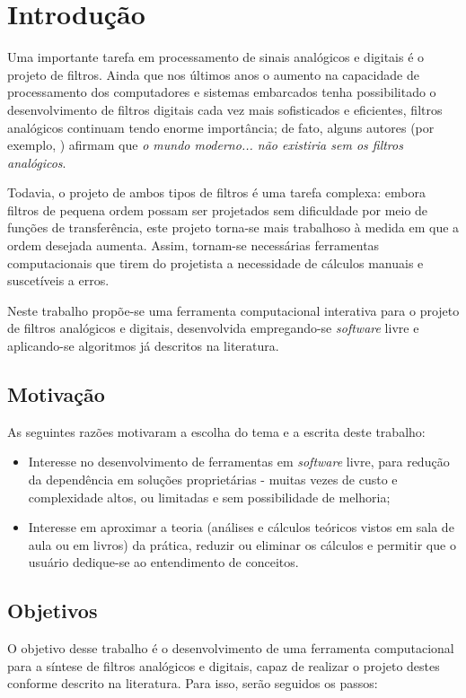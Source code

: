 \chapter{Introdução}

Uma importante tarefa em processamento de sinais analógicos e digitais é o projeto de filtros. Ainda que nos últimos anos o aumento na capacidade de processamento dos computadores e sistemas embarcados tenha possibilitado o desenvolvimento de filtros digitais cada vez mais sofisticados e eficientes, filtros analógicos continuam tendo enorme importância; de fato, alguns autores (por exemplo, \cite{paarmann}) afirmam que \textit{o mundo moderno... não existiria sem os filtros analógicos}.

Todavia, o projeto de ambos tipos de filtros é uma tarefa complexa: embora filtros de pequena ordem possam ser projetados sem dificuldade por meio de funções de transferência, este projeto torna-se mais trabalhoso à medida em que a ordem desejada aumenta. Assim, tornam-se necessárias ferramentas computacionais que tirem do projetista a necessidade de cálculos manuais e suscetíveis a erros.

Neste trabalho propõe-se uma ferramenta computacional interativa para o projeto de filtros analógicos e digitais, desenvolvida empregando-se \textit{software} livre e aplicando-se algoritmos já descritos na literatura. 

\section{Motivação}
As seguintes razões motivaram a escolha do tema e a escrita deste trabalho:
\begin{itemize}
\item Interesse no desenvolvimento de ferramentas em \textit{software} livre, para redução da dependência em soluções proprietárias - muitas vezes de custo e complexidade altos, ou limitadas e sem possibilidade de melhoria;
\item Interesse em aproximar a teoria (análises e cálculos teóricos vistos em sala de aula ou em livros) da prática, reduzir ou eliminar os cálculos e permitir que o usuário dedique-se ao entendimento de conceitos.
\end{itemize}

\section{Objetivos}

O objetivo desse trabalho é o desenvolvimento de uma ferramenta computacional para a síntese de filtros analógicos e digitais, capaz de realizar o projeto destes conforme descrito na literatura. Para isso, serão seguidos os passos:

